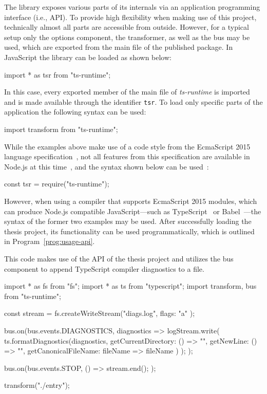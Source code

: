 The library exposes various parts of its internals via an application programming interface (i.e., API). To provide high flexibility when making use of this project, technically almost all parts are accessible from outside. However, for a typical setup only the options component, the transformer, as well as the bus may be used, which are exported from the main file of the published package. In JavaScript the library can be loaded as shown below:
\begin{JsCode}[numbers=none]
import * as tsr from "ts-runtime";
\end{JsCode}
In this case, every exported member of the main file of \emph{ts-runtime} is imported and is made available through the identifier \texttt{tsr}. To load only specific parts of the application the following syntax can be used:
\begin{JsCode}[numbers=none]
import { transform } from "ts-runtime";
\end{JsCode}
While the examples above make use of a code style from the EcmaScript 2015 language specification~\cite[p.~302]{ES6Spec:Ecma:2015}, not all features from this specification are available in Node.js at this time~\cite{Node:Docs:ES6}, and the syntax shown below can be used~\cite{Node:API:Modules}:
\begin{JsCode}[numbers=none]
const tsr = require("ts-runtime");
\end{JsCode}
However, when using a compiler that supports EcmaScript 2015 modules, which can produce Node.js compatible JavaScript---such as TypeScript~\cite{TypeScriptHandbook:Modules} or Babel~\cite{Babel:Plugins}---the syntax of the former two examples may be used. After successfully loading the thesis project, its functionality can be used programmatically, which is outlined in Program~\ref{prog:usage-api}.
\begin{program}
\caption{This code makes use of the API of the thesis project and utilizes the bus component to append TypeScript compiler diagnostics to a file.}
\label{prog:usage-api}
\begin{JsCode}
import * as fs from "fs";
import * as ts from "typescript";
import { transform, bus } from "ts-runtime";

const stream = fs.createWriteStream("diags.log", { flags: "a" });

bus.on(bus.events.DIAGNOSTICS, diagnostics => {
  logStream.write(
    ts.formatDiagnostics(diagnostics, {
      getCurrentDirectory: () => "",
      getNewLine: () => "\n",
      getCanonicalFileName: fileName => fileName
    })
  );
});

bus.on(bus.events.STOP, () => {
  stream.end();
});

transform("./entry");
\end{JsCode}
\end{program}

